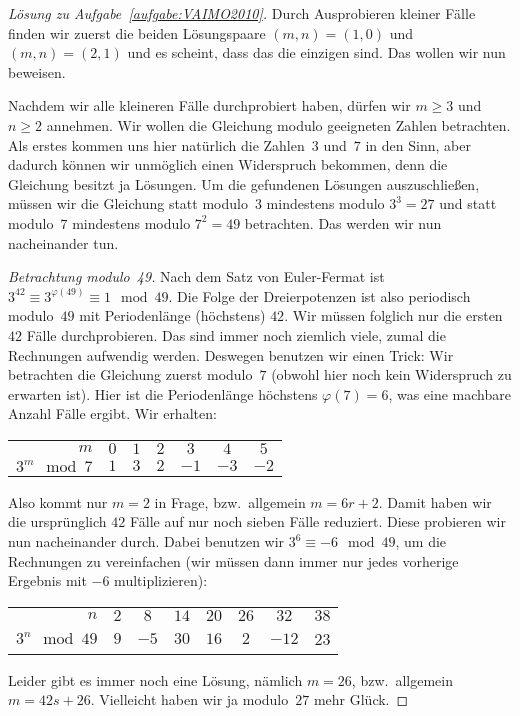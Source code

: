 \begin{proof}[Lösung zu Aufgabe~\ref{aufgabe:VAIMO2010}]
	Durch Ausprobieren kleiner Fälle finden wir zuerst die beiden Lösungspaare $(m,n)=(1,0)$ und $(m,n)=(2,1)$ und es scheint, dass das die einzigen sind. Das wollen wir nun beweisen.
	
	Nachdem wir alle kleineren Fälle durchprobiert haben, dürfen wir $m\geqslant 3$ und $n\geqslant 2$ annehmen. Wir wollen die Gleichung modulo geeigneten Zahlen betrachten. Als erstes kommen uns hier natürlich die Zahlen~$3$ und~$7$ in den Sinn, aber dadurch können wir unmöglich einen Widerspruch bekommen, denn die Gleichung besitzt ja Lösungen. Um die gefundenen Lösungen auszuschließen, müssen wir die Gleichung statt modulo~$3$ mindestens modulo $3^3=27$ und statt modulo~$7$ mindestens modulo $7^2=49$ betrachten. Das werden wir nun nacheinander tun.
	
	\emph{Betrachtung modulo~49.} Nach dem Satz von Euler-Fermat ist $3^{42}\equiv 3^{\varphi(49)}\equiv 1\mod 49$. Die Folge der Dreierpotenzen ist also periodisch modulo~$49$ mit Periodenlänge (höchstens) $42$. Wir müssen folglich nur die ersten~$42$ Fälle durchprobieren. Das sind immer noch ziemlich viele, zumal die Rechnungen aufwendig werden. Deswegen benutzen wir einen Trick: Wir betrachten die Gleichung zuerst modulo~$7$ (obwohl hier noch kein Widerspruch zu erwarten ist). Hier ist die Periodenlänge höchstens $\varphi(7)=6$, was eine machbare Anzahl Fälle ergibt. Wir erhalten:
	\begin{center}
		\begin{tabular}{r | c c c c c c}\toprule
			$m$ & $0$ & $1$ & $2$ & $3$ & $4$ & $5$ \\%
			$3^m\mod 7$ & $1$ & $3$ & $2$ & $-1$ & $-3$ & $-2$\\\bottomrule
		\end{tabular}
	\end{center}
	Also kommt nur $m=2$ in Frage, bzw.\ allgemein $m=6r+2$. Damit haben wir die ursprünglich $42$ Fälle auf nur noch sieben Fälle reduziert. Diese probieren wir nun nacheinander durch. Dabei benutzen wir $3^6\equiv -6\mod 49$, um die Rechnungen zu vereinfachen (wir müssen dann immer nur jedes vorherige Ergebnis mit $-6$ multiplizieren):
	\begin{center}
		\begin{tabular}{r | c c c c c c c}\toprule
			$n$ & $2$ & $8$ & $14$ & $20$ & $26$ & $32$ & $38$ \\%
			$3^n\mod 49$ & $9$ & $-5$ & $30$ & $16$ & $2$ & $-12$ & 23\\\bottomrule
		\end{tabular}
	\end{center}
	Leider gibt es immer noch eine Lösung, nämlich $m=26$, bzw.\ allgemein $m=42s+26$. Vielleicht haben wir ja modulo~$27$ mehr Glück.
	

\end{proof}
